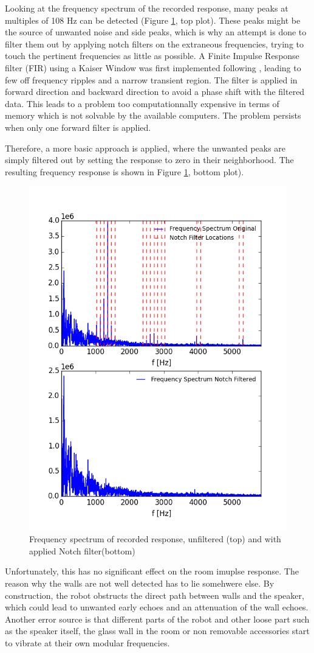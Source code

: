 Looking at the frequency spectrum of the recorded response, many peaks at multiples of 108 Hz can be detected (Figure \ref{fig:RIR_filtered}, top plot). 
These peaks might be the source of unwanted noise and side peaks, which is why an attempt is done to filter them out by applying notch filters on the extraneous frequencies, trying to touch the pertinent frequencies as little as possible. A Finite Impulse Response filter (FIR) using a Kaiser Window was first implemented following \cite{Notch}, leading to few off frequency ripples and a narrow transient region. The filter is applied in forward direction and backward direction to avoid a phase shift with the filtered data. This leads to a problem too computationnally expensive in terms of memory which is not solvable by the available computers. 
The problem persists when only one forward filter is applied. 

Therefore, a more basic approach is applied, where the unwanted peaks are simply filtered out by setting the response to zero in their neighborhood. The resulting frequency response is shown in Figure \ref{fig:RIR_filtered}, bottom plot). 

\begin{figure}[H]
    \centering
    \includegraphics[width=.5\linewidth]{files/NotchY.png}
    \caption{Frequency spectrum of recorded response, unfiltered (top) and with applied Notch filter(bottom)}
    \label{fig:RIR_filtered}
\end{figure}

Unfortunately, this has no significant effect on the room imuplse response.
The reason why the walls are not well detected has to lie somehwere else. 
By construction, the robot obstructs the direct path between walls and the speaker, which could lead to unwanted early echoes and an attenuation of the wall echoes.
Another error source is that different parts of the robot and other loose part such as the speaker itself, the glass wall in the room or non removable accessories start to vibrate at their own modular frequencies.

